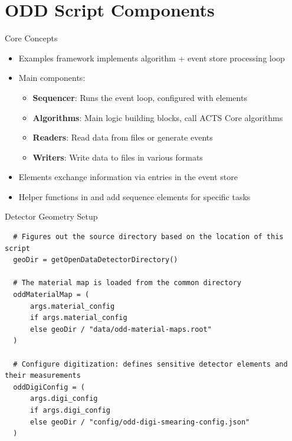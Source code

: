 \documentclass[lualatex,aspectratio=169,t,13pt,dvipsnames]{beamer}
\begin{document}
\section{ODD Script Components}
\begin{frame}{Core Concepts}
  \begin{itemize}
    \item Examples framework implements algorithm + event store processing loop
    \item Main components:
    \begin{itemize}
      \item \textbf{Sequencer}: Runs the event loop, configured with elements
      \item \textbf{Algorithms}: Main logic building blocks, call ACTS Core algorithms
      \item \textbf{Readers}: Read data from files or generate events
      \item \textbf{Writers}: Write data to files in various formats
    \end{itemize}
    \item Elements exchange information via entries in the event store
    \item Helper functions in  and  add sequence elements for specific tasks
  \end{itemize}
\end{frame}

\begin{frame}[fragile]{Detector Geometry Setup}
  \begin{verbatim}
  # Figures out the source directory based on the location of this script
  geoDir = getOpenDataDetectorDirectory()

  # The material map is loaded from the common directory
  oddMaterialMap = (
      args.material_config
      if args.material_config
      else geoDir / "data/odd-material-maps.root"
  )

  # Configure digitization: defines sensitive detector elements and their measurements
  oddDigiConfig = (
      args.digi_config
      if args.digi_config
      else geoDir / "config/odd-digi-smearing-config.json"
  )
  \end{verbatim}
\end{frame}
\end{document}

